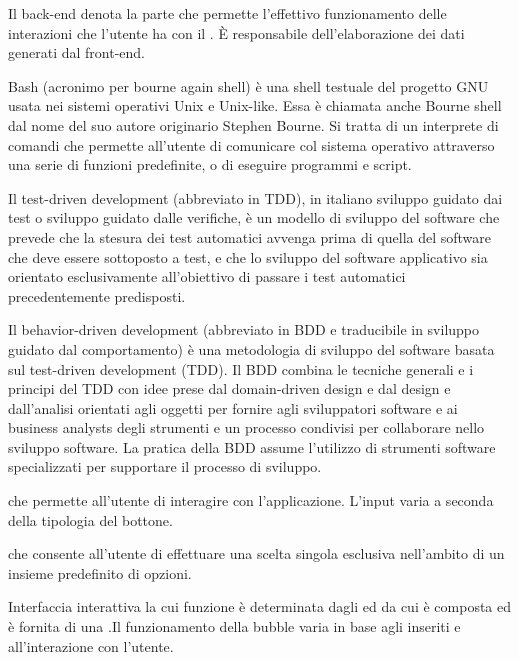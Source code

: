 Il back-end denota la parte che permette l’effettivo funzionamento delle interazioni che l’utente ha con il . È responsabile dell’elaborazione dei dati generati dal front-end.

Bash  (acronimo per bourne again shell) è una shell testuale del progetto GNU usata nei sistemi operativi Unix e Unix-like. Essa è chiamata anche Bourne shell dal nome del suo autore originario Stephen Bourne.
Si tratta di un interprete di comandi che permette all'utente di comunicare col sistema operativo attraverso una serie di funzioni predefinite, o di eseguire programmi e script.

Il test-driven development (abbreviato in TDD), in italiano sviluppo guidato dai test o sviluppo guidato dalle verifiche, è un modello di sviluppo del software che prevede che la stesura dei test automatici avvenga prima di quella del software che deve essere sottoposto a test, e che lo sviluppo del software applicativo sia orientato esclusivamente all'obiettivo di passare i test automatici precedentemente predisposti.

Il behavior-driven development (abbreviato in BDD e traducibile in sviluppo guidato dal comportamento) è una metodologia di sviluppo del software basata sul test-driven development (TDD). Il BDD combina le tecniche generali e i principi del TDD con idee prese dal domain-driven design e dal design e dall'analisi orientati agli oggetti per fornire agli sviluppatori software e ai business analysts degli strumenti e un processo condivisi per collaborare nello sviluppo software. La pratica della BDD assume l'utilizzo di strumenti software specializzati per supportare il processo di sviluppo.

 che permette all’utente di interagire con l’applicazione. L’input varia a seconda della tipologia del bottone.  

 che consente all'utente di effettuare una scelta singola esclusiva nell'ambito di un insieme predefinito di opzioni.

Interfaccia interattiva la cui funzione è determinata dagli   ed  da cui è composta ed è fornita di una  .Il funzionamento della bubble varia in base agli  inseriti e all'interazione con l'utente.

